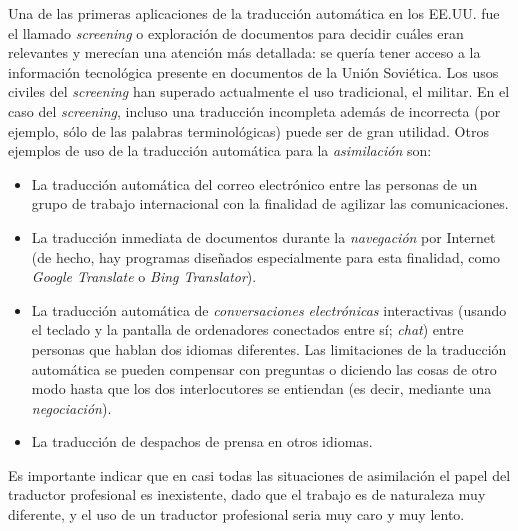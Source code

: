 Una de las primeras aplicaciones de la traducción automática en los EE.UU. fue el llamado \emph{screening} o exploración de documentos para decidir cuáles eran relevantes y merecían una atención más detallada: se quería tener acceso a la información tecnológica presente en documentos de la Unión Soviética. Los usos civiles del \emph{screening} han superado actualmente el uso tradicional, el militar. En el caso del \emph{screening}, incluso una traducción incompleta además de incorrecta (por ejemplo, sólo de las palabras terminológicas) puede ser de gran utilidad. Otros ejemplos de uso de la traducción automática para la \emph{asimilación} son: \begin{itemize} \item La traducción automática del correo electrónico entre las personas de un grupo de trabajo internacional con la finalidad de agilizar las comunicaciones. \item La traducción inmediata de documentos durante la \emph{navegación} por Internet (de hecho, hay programas diseñados especialmente para esta finalidad, como \emph{Google Translate} o \emph{Bing Translator}). \item La traducción automática de \emph{conversaciones electrónicas} interactivas (usando el teclado y la pantalla de ordenadores conectados entre sí; \emph{chat}) entre personas que hablan dos idiomas diferentes. Las limitaciones de la traducción automática se pueden compensar con preguntas o diciendo las cosas de otro modo hasta que los dos interlocutores se entiendan (es decir, mediante una \emph{negociación}). \item La traducción de despachos de prensa en otros idiomas. \end{itemize} 

Es importante indicar que en casi todas las situaciones de asimilación el papel del traductor profesional es inexistente, dado que el trabajo es de naturaleza muy diferente, y el uso de un traductor profesional seria muy caro y muy lento. 

